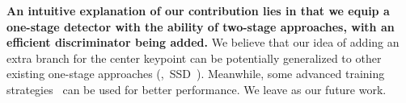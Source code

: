 \documentclass[10pt,twocolumn,letterpaper]{article}
\begin{document}
{\bf An intuitive explanation of our contribution lies in that we equip a one-stage detector with the ability of two-stage approaches, with an efficient discriminator being added.} We believe that our idea of adding an extra branch for the center keypoint can be potentially generalized to other existing one-stage approaches (\eg,~SSD~\cite{liu2016ssd}). Meanwhile, some advanced training strategies~\cite{zhuscratchdet} can be used for better performance. We leave as our future work.

{\small


}
\end{document}
